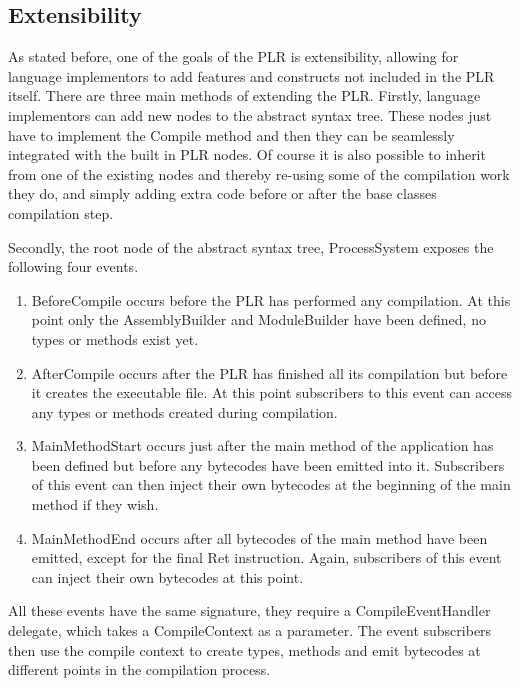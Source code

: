 \subsection{Extensibility}
	
	As stated before, one of the goals of the PLR is extensibility, allowing
	for language implementors to add features and constructs not included in
	the PLR itself. There are three main methods of extending the PLR. Firstly,
	language implementors can add new nodes to the abstract syntax tree. These
	nodes just have to implement the \textsf{Compile} method and then they can
	be seamlessly integrated with the built in PLR nodes. Of course it is also
	possible to inherit from one of the existing nodes and thereby re-using some
	of the compilation work they do, and simply adding extra code before or after
	the base classes compilation step. 
	
	Secondly, the root node of the abstract	syntax tree, \textsf{ProcessSystem} 
	exposes the following four events. 
	
	\begin{enumerate}
		\item \textsf{BeforeCompile} occurs before the PLR has performed any 
		compilation. At this point only the \textsf{AssemblyBuilder} and 
		\textsf{ModuleBuilder} have been defined, no types or methods exist yet.
		
		\item \textsf{AfterCompile} occurs after the PLR has finished all its
		compilation but before it creates the executable file. At this point
		subscribers to this event can access any types or methods created during
		compilation.
		
		\item \textsf{MainMethodStart} occurs just after the main method of the
		application has been defined but before any bytecodes have been emitted
		into it. Subscribers of this event can then inject their own bytecodes at 
		the beginning of the main method if they wish.
		
		\item \textsf{MainMethodEnd} occurs after all bytecodes of the main method
		have been emitted, except for the final \textsf{Ret} instruction. Again, 
		subscribers of this event can inject their own bytecodes at this point.
	\end{enumerate}
	
	All these events have the same signature, they require a 
	\textsf{CompileEventHandler} delegate, which takes a \textsf{CompileContext} 
	as a parameter. The event subscribers then use the compile context to create 
	types, methods and emit bytecodes at different points in the compilation 
	process.
	
